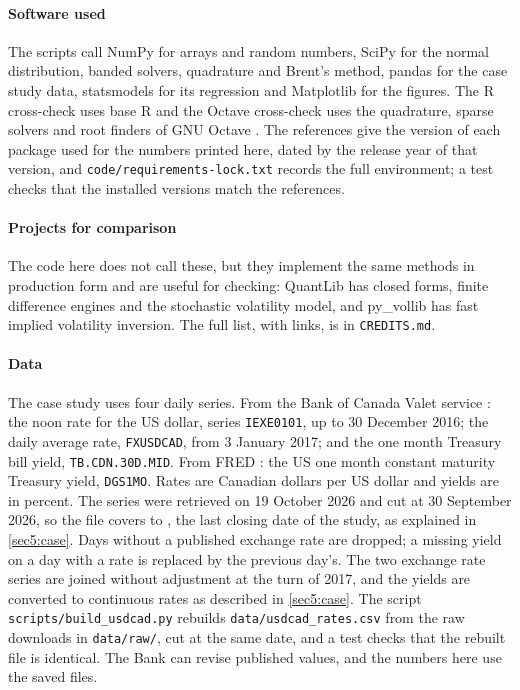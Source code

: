 \begin{chapterrefs}
\paragraph{Software used}
The scripts call NumPy \parencite{numpy} for arrays and random numbers, SciPy \parencite{scipy} for the normal
distribution, banded solvers, quadrature and Brent's method, pandas \parencite{pandas} for the case study
data, statsmodels \parencite{statsmodels} for its regression and Matplotlib \parencite{matplotlib} for the figures. The R
cross-check uses base R \parencite{rcore} and the Octave cross-check uses the quadrature, sparse
solvers and root finders of GNU Octave \parencite{octave}. The references give the version of each
package used for the numbers printed here, dated by the release year of that version, and
\texttt{code/requirements-lock.txt} records the full environment; a test checks that the installed
versions match the references.

\paragraph{Projects for comparison}
The code here does not call these, but they implement the same methods in production form and are
useful for checking: QuantLib \parencite{quantlib} has closed forms, finite difference engines and the
stochastic volatility model, and py\_vollib \parencite{pyvollib} has fast implied volatility inversion. The full
list, with links, is in \texttt{CREDITS.md}.

\paragraph{Data}
The case study uses four daily series. From the Bank of Canada Valet service \parencite{bocfx}: the
noon rate for the US dollar, series \texttt{IEXE0101}, up to 30 December 2016; the daily average
rate, \texttt{FXUSDCAD}, from 3 January 2017; and the one month Treasury bill yield,
\texttt{TB.CDN.30D.MID}. From FRED \parencite{fredDGS}: the US one month constant maturity Treasury
yield, \texttt{DGS1MO}. Rates are Canadian dollars per US dollar and yields are in percent. The series were
retrieved on 19 October 2026 and cut at 30 September 2026, so the file covers \fxStart{} to \fxEnd,
the last closing date of the study, as explained in \cref{sec5:case}. Days without a published exchange rate are dropped; a
missing yield on a day with a rate is replaced by the previous day's. The two exchange rate series are
joined without adjustment at the turn of 2017, and the yields are converted to continuous rates as
described in \cref{sec5:case}.
The script \texttt{scripts/build\_usdcad.py} rebuilds \texttt{data/usdcad\_rates.csv} from the raw
downloads in \texttt{data/raw/}, cut at the same date, and a test checks that the rebuilt file is identical. The Bank can
revise published values, and the numbers here use the saved files.

\end{chapterrefs}
